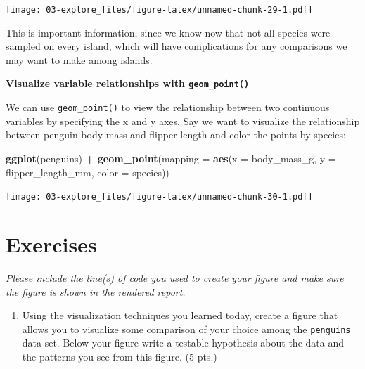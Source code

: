 \documentclass[
]{book}
\newenvironment{Shaded}{\begin{snugshade}}{\end{snugshade}}
\newcommand{\AttributeTok}[1]{\textcolor[rgb]{0.13,0.29,0.53}{#1}}
\newcommand{\FunctionTok}[1]{\textcolor[rgb]{0.13,0.29,0.53}{\textbf{#1}}}
\newcommand{\NormalTok}[1]{#1}
\newcommand{\SpecialCharTok}[1]{\textcolor[rgb]{0.81,0.36,0.00}{\textbf{#1}}}
\providecommand{\tightlist}{%
  \setlength{\itemsep}{0pt}\setlength{\parskip}{0pt}}
\begin{document}
\texttt{[image: 03-explore\_files/figure-latex/unnamed-chunk-29-1.pdf]}

This is important information, since we know now that not all species were sampled on every island, which will have complications for any comparisons we may want to make among islands.

\textbf{Visualize variable relationships with \texttt{geom\_point()}}

We can use \texttt{geom\_point()} to view the relationship between two continuous variables by specifying the x and y axes. Say we want to visualize the relationship between penguin body mass and flipper length and color the points by species:

\begin{Shaded}
\begin{Highlighting}[]
\FunctionTok{ggplot}\NormalTok{(penguins) }\SpecialCharTok{+}
  \FunctionTok{geom\_point}\NormalTok{(}\AttributeTok{mapping =} \FunctionTok{aes}\NormalTok{(}\AttributeTok{x =}\NormalTok{ body\_mass\_g, }\AttributeTok{y =}\NormalTok{ flipper\_length\_mm, }\AttributeTok{color =}\NormalTok{ species))}
\end{Highlighting}
\end{Shaded}

\texttt{[image: 03-explore\_files/figure-latex/unnamed-chunk-30-1.pdf]}

\hypertarget{exercises-3}{%
\section{Exercises}\label{exercises-3}}

\emph{Please include the line(s) of code you used to create your figure and make sure the figure is shown in the rendered report.}

\begin{enumerate}
\def\labelenumi{\arabic{enumi}.}
\tightlist
\item
  Using the visualization techniques you learned today, create a figure that allows you to visualize some comparison of your choice among the \texttt{penguins} data set. Below your figure write a testable hypothesis about the data and the patterns you see from this figure. (5 pts.)
\end{enumerate}

  
\end{document}
